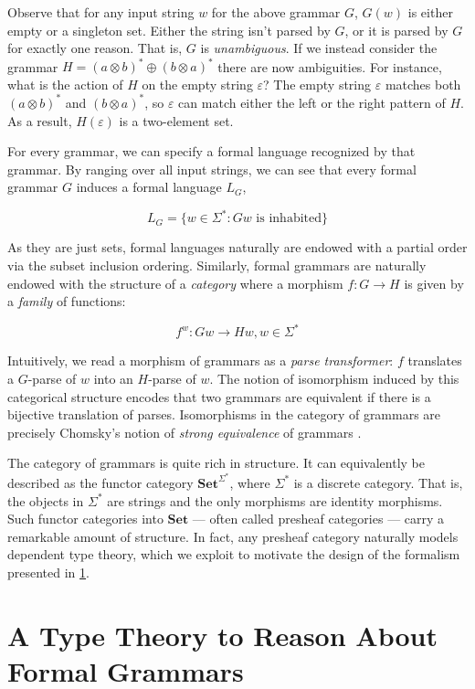 \documentclass[acmsmall,screen,nonacm]{acmart}
\newcommand{\String}{\Sigma^{*}}
\newcommand{\Set}{\mathbf{Set}}
\begin{document}
Observe that for any input string $w$ for the above grammar $G$, $G(w)$ is
either empty or a singleton set. Either the string isn't parsed by $G$,
or it is parsed by $G$ for exactly one reason. That is, $G$ is
\emph{unambiguous}. If we instead consider the grammar
$H = (a \otimes b)^{*} \oplus (b \otimes a)^{*}$ there are now ambiguities. For
instance, what is the action of $H$ on the empty string $\varepsilon$?
The empty string $\varepsilon$ matches both $(a \otimes b)^{*}$ and $(b \otimes a)^{*}$, so
$\varepsilon$ can match either the left or the right pattern
of $H$. As a result, $H(\varepsilon)$ is a two-element set.

For every grammar, we can specify a formal language recognized by that grammar. By ranging over all input strings, we can
see that every formal grammar $G$ induces a formal language $L_{G}$,

\[
  L_{G} = \{ w \in \String : G w \text{ is inhabited} \}
\]

As they are just sets, formal languages naturally are
endowed with a partial
order via the subset inclusion ordering. Similarly, formal grammars are
naturally endowed with the structure of a \emph{category} where a morphism
$f : G \to H$ is given by a \emph{family} of functions:


\[
  f^{w} : Gw \to Hw, w \in \String
\]

Intuitively, we read a morphism of grammars as a \emph{parse transformer}: $f$
translates a
$G$-parse of $w$ into an $H$-parse of $w$. The notion of isomorphism induced by
this categorical structure encodes that two grammars are equivalent if there is
a bijective translation of parses. Isomorphisms in the category of
grammars are precisely Chomsky's notion of \emph{strong equivalence} of
grammars \cite{chom1963}.

The category of grammars is quite rich in structure. It can
equivalently be described as the functor category $\Set^{\String}$, where
$\String$ is a discrete category. That is, the objects in $\String$ are strings
and the only morphisms are identity morphisms. Such functor categories into
$\Set$ --- often called presheaf categories --- carry a remarkable amount of
structure. In fact, any presheaf category naturally models dependent type
theory, which we exploit to motivate the design of the formalism
presented in \cref{sec:tt}.


\section{A Type Theory to Reason About Formal Grammars}
\label{sec:tt}
\end{document}
